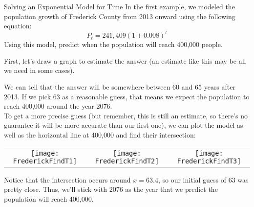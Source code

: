 \begin{example}{Solving an Exponential Model for Time}
In the first example, we modeled the population growth of Frederick County from 2013 onward using the following equation:
\[P_t = 241,409(1+0.008)^t\]
Using this model, predict when the population will reach 400,000 people.

\sol
First, let's draw a graph to estimate the answer (an estimate like this may be all we need in some cases).
\begin{center}
\end{center}

We can tell that the answer will be somewhere between 60 and 65 years after 2013.  If we pick 63 as a reasonable guess, that means we expect the population to reach 400,000 around the year 2076.\\

To get a more precise guess (but remember, this is still an estimate, so there's no guarantee it will be more accurate than our first one), we can plot the model as well as the horizontal line at 400,000 and find their intersection:
\begin{center}
\begin{tabular}{c c c}
\texttt{[image: FrederickFindT1]}
& \texttt{[image: FrederickFindT2]}
& \texttt{[image: FrederickFindT3]}
\end{tabular}
\end{center}

Notice that the intersection occurs around $x=63.4$, so our initial guess of 63 was pretty close.  Thus, we'll stick with 2076 as the year that we predict the population will reach 400,000.
\end{example}

